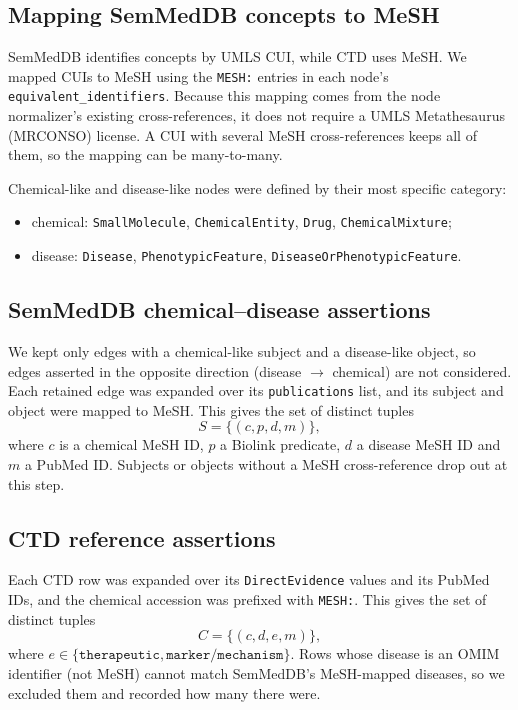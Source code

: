 \documentclass[11pt]{article}
\newcommand{\code}[1]{\texttt{#1}}
\begin{document}
\subsection{Mapping SemMedDB concepts to MeSH}

SemMedDB identifies concepts by UMLS CUI, while CTD uses MeSH. We mapped CUIs
to MeSH using the \code{MESH:} entries in each node's
\code{equivalent\_identifiers}. Because this mapping comes from the node
normalizer's existing cross-references, it does not require a UMLS
Metathesaurus (MRCONSO) license. A CUI with several MeSH cross-references
keeps all of them, so the mapping can be many-to-many.

Chemical-like and disease-like nodes were defined by their most specific
category:
\begin{itemize}[nosep]
  \item chemical: \code{SmallMolecule}, \code{ChemicalEntity}, \code{Drug},
        \code{ChemicalMixture};
  \item disease: \code{Disease}, \code{PhenotypicFeature},
        \code{DiseaseOrPhenotypicFeature}.
\end{itemize}

\subsection{SemMedDB chemical--disease assertions}

We kept only edges with a chemical-like subject and a disease-like object, so
edges asserted in the opposite direction (disease $\rightarrow$ chemical) are
not considered. Each retained edge was expanded over its \code{publications}
list, and its subject and object were mapped to MeSH. This gives the set of
distinct tuples
\[
  S = \{(c, p, d, m)\},
\]
where $c$ is a chemical MeSH ID, $p$ a Biolink predicate, $d$ a disease MeSH
ID and $m$ a PubMed ID. Subjects or objects without a MeSH cross-reference
drop out at this step.

\subsection{CTD reference assertions}

Each CTD row was expanded over its \code{DirectEvidence} values and its PubMed
IDs, and the chemical accession was prefixed with \code{MESH:}. This gives the
set of distinct tuples
\[
  C = \{(c, d, e, m)\},
\]
where $e \in \{\code{therapeutic}, \code{marker/mechanism}\}$. Rows whose
disease is an OMIM identifier (not MeSH) cannot match SemMedDB's MeSH-mapped
diseases, so we excluded them and recorded how many there were.
\end{document}
